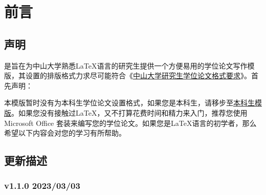 \chapter{前\hspace*{1\ccwd}言}

\section{声明}


\sysuthesis{}是旨在为中山大学熟悉\LaTeX{}语言的研究生提供一个方便易用的学位论文写作模版，其设置的排版格式力求尽可能符合《\href{https://sysgraduate.sysu.edu.cn/sites/graduate.prod.dpcms4.sysu.edu.cn/files/2019-04/%E4%B8%AD%E5%B1%B1%E5%A4%A7%E5%AD%A6%E7%A0%94%E7%A9%B6%E7%94%9F%E5%AD%A6%E4%BD%8D%E8%AE%BA%E6%96%87%E6%A0%BC%E5%BC%8F%E8%A6%81%E6%B1%82.pdf}{中山大学研究生学位论文格式要求}》。首先声明：

本模版暂时没有为本科生学位论文设置格式，如果您是本科生，请移步至\href{https://github.com/SYSU-SCC/sysu-thesis}{本科生模版}。如果您没有接触过\LaTeX{}，又不打算花费时间和精力来入门，推荐您使用 Microsoft Office 套装来编写您的学位论文。如果您是\LaTeX{}语言的初学者，那么希望以下内容会对您的学习有所帮助。

\section{更新描述}

\subsection*{v1.1.0 2023/03/03}

